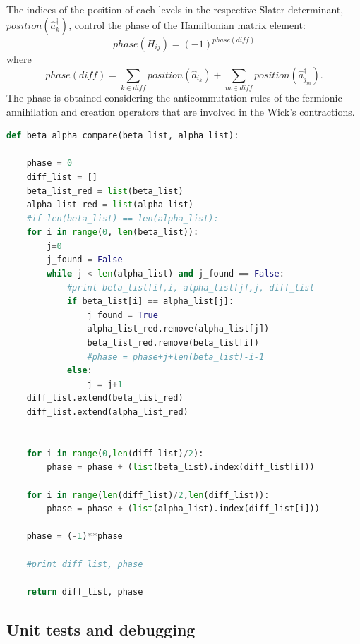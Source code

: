 \documentclass[twoside]{article}
\newcommand{\bra}[1]{\langle #1 |}
\newcommand{\ket}[1]{| #1 \rangle}
\begin{document}
The indices of the position of each levels in the respective Slater determinant, $position(\hat a_{k}^\dagger)$, control the phase of the Hamiltonian matrix element:
\begin{equation}
phase(H_{ij}) = (-1)^{phase(diff)} 
\end{equation}
where
\begin{equation}
phase(diff)=\sum_{k \in diff} position(\hat a_{i_k})+\sum_{m \in diff} position(\hat a_{j_m}^\dagger).
\end{equation}
The phase is obtained considering the anticommutation rules of the fermionic annihilation and creation operators that are involved in the Wick's contractions.
\begin{lstlisting}[language=Python,label=compare, caption=\texttt{beta\_alpha\_compare} is a function in module \texttt{compare.py} that makes a comparison between $\protect{\bra{\Phi_\beta}}$ and $\protect{\ket{\Phi_\alpha}}$ to determine their difference in terms of single-particle states.]
def beta_alpha_compare(beta_list, alpha_list):
    
    phase = 0
    diff_list = []
    beta_list_red = list(beta_list)
    alpha_list_red = list(alpha_list)
    #if len(beta_list) == len(alpha_list):
    for i in range(0, len(beta_list)):
        j=0
        j_found = False
        while j < len(alpha_list) and j_found == False:
            #print beta_list[i],i, alpha_list[j],j, diff_list
            if beta_list[i] == alpha_list[j]:
                j_found = True
                alpha_list_red.remove(alpha_list[j])
                beta_list_red.remove(beta_list[i])
                #phase = phase+j+len(beta_list)-i-1
            else:
                j = j+1
    diff_list.extend(beta_list_red)
    diff_list.extend(alpha_list_red)


    for i in range(0,len(diff_list)/2):
    	phase = phase + (list(beta_list).index(diff_list[i]))
 
    for i in range(len(diff_list)/2,len(diff_list)):
        phase = phase + (list(alpha_list).index(diff_list[i]))
        
    phase = (-1)**phase

    #print diff_list, phase
    
    return diff_list, phase

\end{lstlisting}


\subsection{Unit tests and debugging}
\end{document}
